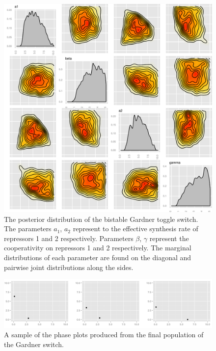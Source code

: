 \begin{figure}[p]
\centering
\includegraphics[scale=0.7]{chapterModelling/images/Gardner/posterior.pdf}
\caption[The posterior distribution of the bistable Gardner toggle switch]{The posterior distribution of the bistable Gardner toggle switch. The parameters $a_1$, $a_2$ represent to the effective synthesis rate of repressors 1 and 2 respectively. Parameters $\beta$, $\gamma$ represent the cooperativity on repressors 1 and 2 respectively. The marginal distributions of each parameter are found on the diagonal and pairwise joint distributions along the sides.}
\label{fig:Gard_post}
\end{figure}

\clearpage
\begin{figure}[p]
\centering
\includegraphics[scale=0.4]{chapterModelling/images/Gardner/phase_plots.png}
\caption{A sample of the phase plots produced from the final population of the Gardner switch.}
\label{fig:det_gard_phase}
\end{figure}

